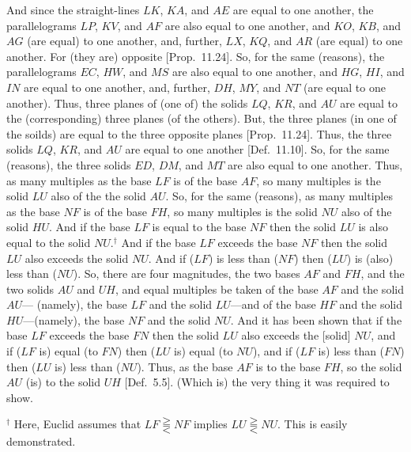 \begin{Parallel}{}{}
{And since the straight-lines $LK$, $KA$, and $AE$ are equal to one another,
the parallelograms $LP$, $KV$, and $AF$ are also equal to
one another, and $KO$, $KB$, and $AG$ (are equal) to one another, and,
further, $LX$, $KQ$, and $AR$ (are equal) to one another. For (they
are) opposite [Prop.~11.24]. So, for the
same (reasons), the parallelograms $EC$, $HW$, and $MS$
are also equal to one another, and $HG$, $HI$, and $IN$ are equal to
one another, and, further, $DH$, $MY$, and $NT$ (are equal to one another).
Thus, three planes of (one of) the solids $LQ$, $KR$, and $AU$ are equal to
the (corresponding) three planes (of the others). But, the three planes
(in one of the soilds) are equal to the three opposite planes [Prop.~11.24]. Thus, the three solids $LQ$,
$KR$, and $AU$ are equal to one another [Def.~11.10]. So, for the same (reasons), the
three solids $ED$, $DM$, and $MT$ are also equal to one another.
Thus, as many multiples as the base $LF$ is of the base $AF$, so many
multiples is the solid $LU$ also of the the solid $AU$. So, for the same (reasons), 
as many multiples as the base $NF$ is of the base $FH$, so many
multiples is the solid $NU$ also of the solid $HU$. And if the base
$LF$ is equal to the base $NF$ then the solid $LU$ is also
equal to the solid $NU$.$^\dag$ And if the base $LF$  exceeds the base $NF$
then the solid $LU$ also exceeds the solid $NU$. And if ($LF$) is less than ($NF$) then ($LU$) is (also) less than ($NU$). So, there are four magnitudes, the
two bases $AF$ and $FH$, and the two solids $AU$ and $UH$, and
equal multiples be taken of the base $AF$ and the solid $AU$--- (namely), the base $LF$ and the solid $LU$---and of the base
$HF$ and the solid $HU$---(namely), the base $NF$ and the solid $NU$.
And it has been shown that if the base $LF$ exceeds the base $FN$ then the
solid $LU$ also exceeds the [solid] $NU$, and if ($LF$ is) equal (to $FN$) then
($LU$ is) equal (to $NU$), and if ($LF$ is) less than ($FN$) then 
($LU$ is) less than ($NU$). Thus, as the base $AF$ is to the base
$FH$, so the solid $AU$ (is) to the solid $UH$ [Def.~5.5]. (Which is) the very thing it was required to show.}
\end{Parallel}
{\footnotesize\noindent$^\dag$ Here, Euclid assumes that $LF\gtreqqless NF$ implies $LU \gtreqqless NU$. This is easily demonstrated.}

